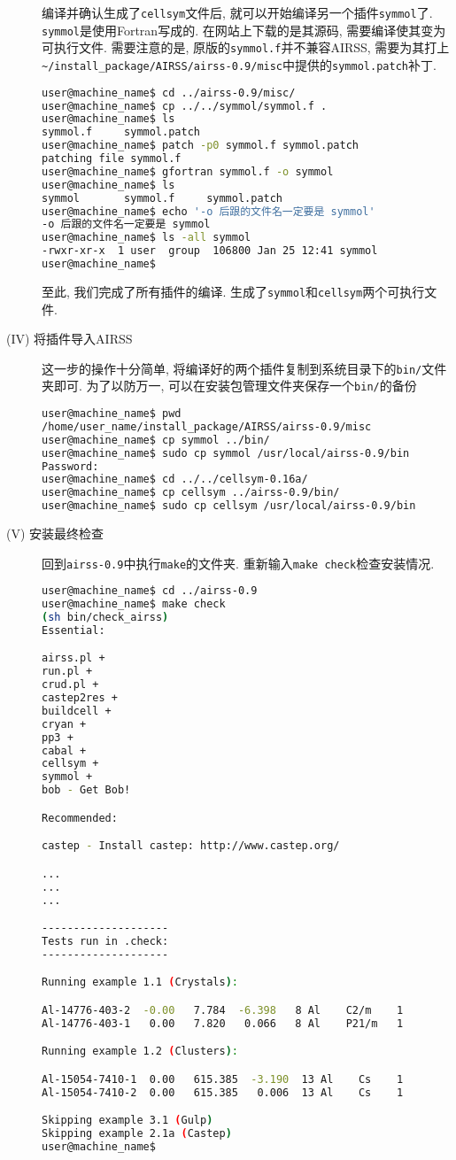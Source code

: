 \documentclass[a4paper, 10pt]{article}
\begin{document}
\begin{description}
编译并确认生成了\verb|cellsym|文件后, 就可以开始编译另一个插件\verb|symmol|了.
\verb|symmol|是使用Fortran写成的. 在网站上下载的是其源码, 需要编译使其变为可执行文件.
需要注意的是, 原版的\verb|symmol.f|并不兼容AIRSS, 需要为其打上\verb|~/install_package/AIRSS/airss-0.9/misc|中提供的\verb|symmol.patch|补丁.
\begin{lstlisting}[language={bash}]
user@machine_name$ cd ../airss-0.9/misc/
user@machine_name$ cp ../../symmol/symmol.f .
user@machine_name$ ls
symmol.f     symmol.patch
user@machine_name$ patch -p0 symmol.f symmol.patch 
patching file symmol.f
user@machine_name$ gfortran symmol.f -o symmol 
user@machine_name$ ls 
symmol       symmol.f     symmol.patch
user@machine_name$ echo '-o 后跟的文件名一定要是 symmol'
-o 后跟的文件名一定要是 symmol
user@machine_name$ ls -all symmol
-rwxr-xr-x  1 user  group  106800 Jan 25 12:41 symmol
user@machine_name$
\end{lstlisting}

至此, 我们完成了所有插件的编译. 生成了\verb|symmol|和\verb|cellsym|两个可执行文件.

\item[(IV) 将插件导入AIRSS]
这一步的操作十分简单, 将编译好的两个插件复制到系统目录下的\verb|bin/|文件夹即可. 为了以防万一, 可以在安装包管理文件夹保存一个\verb|bin/|的备份
\begin{lstlisting}[language={bash}]
user@machine_name$ pwd
/home/user_name/install_package/AIRSS/airss-0.9/misc
user@machine_name$ cp symmol ../bin/
user@machine_name$ sudo cp symmol /usr/local/airss-0.9/bin
Password:
user@machine_name$ cd ../../cellsym-0.16a/
user@machine_name$ cp cellsym ../airss-0.9/bin/
user@machine_name$ sudo cp cellsym /usr/local/airss-0.9/bin
\end{lstlisting}

\item[(V) 安装最终检查]
回到\verb|airss-0.9|中执行\verb|make|的文件夹. 重新输入\verb|make check|检查安装情况.
\begin{lstlisting}[language={bash}]
user@machine_name$ cd ../airss-0.9
user@machine_name$ make check
(sh bin/check_airss)
Essential:

airss.pl +
run.pl +
crud.pl +
castep2res +
buildcell +
cryan +
pp3 +
cabal +
cellsym +
symmol +
bob - Get Bob!

Recommended:

castep - Install castep: http://www.castep.org/

...
...
...

--------------------
Tests run in .check:
--------------------

Running example 1.1 (Crystals):

Al-14776-403-2  -0.00   7.784  -6.398   8 Al    C2/m    1
Al-14776-403-1   0.00   7.820   0.066   8 Al    P21/m   1

Running example 1.2 (Clusters):

Al-15054-7410-1  0.00   615.385  -3.190  13 Al    Cs    1
Al-15054-7410-2  0.00   615.385   0.006  13 Al    Cs    1

Skipping example 3.1 (Gulp)
Skipping example 2.1a (Castep)
user@machine_name$
\end{lstlisting}
\end{description}
\end{document}
